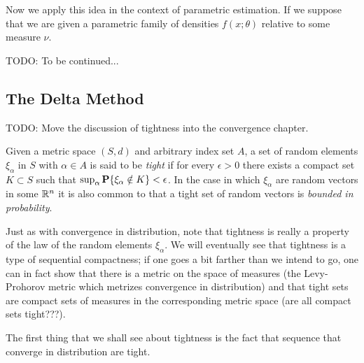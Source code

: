 Now we apply this idea in the context of parametric estimation.  If we
suppose that we are given a parametric family of densities $f(x;
\theta)$ relative to some measure $\nu$.

TODO: To be continued...

\subsection{The Delta Method}

TODO: Move the discussion of tightness into the convergence chapter.

\begin{defn}Given a metric space $(S,d)$ and arbitrary index set $A$, a set of random elements
  $\xi_\alpha$ in $S$ with $\alpha \in A$ is said to be \emph{tight} if for
  every $\epsilon > 0$ there exists a compact set $K \subset S$ such
  that $\sup_\alpha \textbf{P}\{\xi_\alpha \notin K\} < \epsilon$.  In
  the case in which $\xi_\alpha$ are random vectors in some $\mathbb{R}^n$
  it is also common to that a tight set of random vectors is
  \emph{bounded in probability}.
\end{defn}

Just as with convergence in distribution, note that tightness is
really a property of the law of the random elements $\xi_\alpha$.  
We will eventually see that tightness is a type of sequential
compactness; if one goes a bit farther than we intend to go, one can in
fact show that there is a metric on the space of measures (the
Levy-Prohorov metric which metrizes convergence in distribution) and that tight sets are compact sets of
measures in the corresponding metric space (are all compact sets tight???).

The first thing that we shall see about tightness is the fact that
sequence that converge in distribution are tight.

